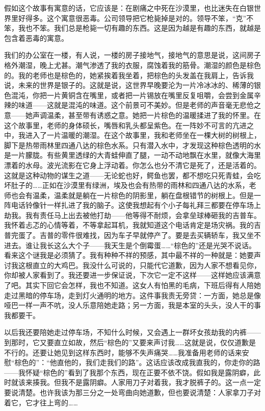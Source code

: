 假如这个故事有寓意的话，它应该是：在剧痛之中死在沙漠里，也比迷失在白银世界里好得多。这个寓意很恶毒。公司领导把它枪毙掉是对的。领导不笨，“克”不笨，我也不笨。我们总是枪毙一切有趣的东西。这是因为越是有趣的东西，就越是包含着恶毒的寓意。 

我们的办公室在一楼，有人说，一楼的房子接地气，接地气的意思是说，这间房子格外潮湿，晚上尤甚。潮气渗透了我的衣服，腐蚀着我的筋骨。潮湿的颜色是棕色的。我的老师也是棕色的，她紧挨着我坐着，把棕色的头发盖在我肩上，告诉我说，未来的世界是银子的。这就是说，这世界早晚要沦为一片冷冰冰的、稀薄的银色混沌，你把一片黄铜含在嘴里，或者把一片锡放在嘴里反复咀嚼，会尝到金属辛辣的味道——这就是混沌的味道。这个前景可不美妙。但是老师的声音毫无悲伧之意——她声调温柔，甚至带有诱惑之意。她把一片棕色的温暖揉进了我的怀里。在这个故事里，老师的身体硕长，嘴唇和乳头都呈紫色。在一阵妙不可言的亢进之中，我进入了一片温暖的潮湿。在这个故事里，我和老师坐在一棵大树的树根上，脚下是热带雨林里四通八达的棕色水系。只有潜入水中，才发现这种棕色透明的水是一片朦胧。有些黄里透绿的大青蛙伸直了腿，一动不动地飘在水里，就像大海里漂着的水母。波光流影在它身上浮动着。你怎么也分不清它是死了，还是活着的。这就是这种动物的谋生之道——无论蛇也好，鳄鱼也罢，都不想吃只死青蛙，会吃坏肚子的……正如在沙漠里有绿洲，埃及也会有热带的雨林和四通八达的水系，老师也会有温柔，温柔就是躺在一片棕色的阴影里，躺在盘根错节的树根上。但是一阵电话铃像针一样扎进了我的脑子。这使我想起有个小子每礼拜三都要在停车场上劫我。我有责任马上出去被他打劫——他等得不耐烦，会拿垒球棒砸我的吉普车。我怀着忐忑的心情等着，不等拿起耳机，我就知道这个电话肯定是场灾祸。我的吉普完蛋了。吉普的零件很难找，因为车子早就停产了。要是去买辆轿车，我又坐不进去。谁让我长这么大个子——我天生是个倒霉蛋……“棕色的”还是光哭不说话。看来这个谜我是必须猜了。我有种种不祥的预感，其中最不祥的一种就是：她要声讨我这根直立的大鸡巴。我没什么可说的，只能代它道歉，因为人家不想看见你，你却被人家看到了。我还要进一步保证说，下次它一定不这样——这样她应该满意了吧。其实下回它会怎样，我也不知道。这女人有怕黑的毛病，下班后得有人陪她走过黑暗的停车场，走到灯火通明的地方。这件事我责无旁贷：一方面，她总是像哑巴一样一声不吭，没人乐意陪她走路；另一方面，我是本室的头头，没人干的事我都要干。 

以后我还要陪她走过停车场，不知什么时候，又会遇上一群坏女孩劫我的内裤——到那时，它又要直立如故，然后“棕色的”又要来声讨我……这就是说，仅仅道歉是不行的。还要让她见到这样东西时，能够不失声痛哭……我准备用老师的话来安慰“棕色的”：“他直他的，我们走我们的路”。这话应该改成我直我的，你走你的路——我怀疑“棕色的”看到了我那个东西，现在正要不依不饶。假如我是露阴癖，此时就该来揍我。但我不是露阴癖。人家用刀子对着我，我才脱裤子的。这一点一定要说清楚。也许我该为那三分之一处弯曲向她道歉，但也要说清楚：人家拿刀子对着它，它才往上弯的…… 

